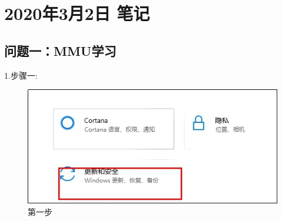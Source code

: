 \chapter{2020年3月2日 笔记}
\graphicspath{{note_everyday/001_20200302/picture/}}
\section{问题一：MMU学习}


1.步骤一:
\begin{figure}[h]
    \includegraphics{001.jpg}
    \caption{第一步}
\end{figure}


